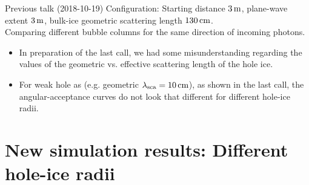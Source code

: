 \begin{frame}[fragile]{Previous talk (2018-10-19)}
  \tiny Configuration: Starting distance $3\text{\,m}$, plane-wave extent $3\text{\,m}$, bulk-ice geometric scattering length $130\text{\,cm}$. \\
  Comparing different bubble columns for the same direction of incoming photons.
  \normalsize

  \begin{itemize}
    \item In preparation of the last call, we had some misunderstanding regarding the values of the geometric vs. effective scattering length of the hole ice.
    \item For weak hole as (e.g. geometric $\lambda_\text{sca} = 10\text{\,cm}$), as shown in the last call, the angular-acceptance curves do not look that different for different hole-ice radii.
  \end{itemize}

\end{frame}

\section{New simulation results: Different hole-ice radii}

